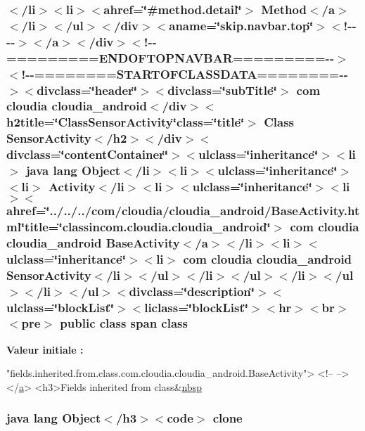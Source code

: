 \hypertarget{_sensor_activity_8html_adfb338aa5962a7e3f9a062e004b66989}{
\subsubsection[{class}]{\setlength{\rightskip}{0pt plus 5cm}$<$/li$>$$<$li$>$$<$ahref=\char`\"{}\#method.\-detail\char`\"{}$>$ Method$<$/{\bf a}$>$$<$/li$>$$<$/ul$>$$<$/div$>$$<$aname=\char`\"{}skip.\-navbar.\-top\char`\"{}$>$$<$!-\/-\/-\/-\/$>$$<$/a$>$$<$/div$>$$<$!-\/-\/=========E\-N\-D\-O\-F\-T\-O\-P\-N\-A\-V\-B\-A\-R=========-\/-\/$>$$<$!-\/-\/========S\-T\-A\-R\-T\-O\-F\-C\-L\-A\-S\-S\-D\-A\-T\-A========-\/-\/$>$$<$divclass=\char`\"{}header\char`\"{}$>$$<$divclass=\char`\"{}sub\-Title\char`\"{}$>$ com cloudia cloudia\-\_\-android$<$/div$>$$<$h2title=\char`\"{}Class\-Sensor\-Activity\char`\"{}class=\char`\"{}title\char`\"{}$>$ Class {\bf Sensor\-Activity}$<$/h2$>$$<$/div$>$$<$divclass=\char`\"{}content\-Container\char`\"{}$>$$<$ulclass=\char`\"{}inheritance\char`\"{}$>$$<$li$>$ java lang Object$<$/li$>$$<$li$>$$<$ulclass=\char`\"{}inheritance\char`\"{}$>$$<$li$>$ Activity$<$/li$>$$<$li$>$$<$ulclass=\char`\"{}inheritance\char`\"{}$>$$<$li$>$$<$ahref=\char`\"{}../../../com/cloudia/cloudia\-\_\-android/Base\-Activity.\-html\char`\"{}title=\char`\"{}classincom.\-cloudia.\-cloudia\-\_\-android\char`\"{}$>$ com cloudia cloudia\-\_\-android {\bf Base\-Activity}$<$/{\bf a}$>$$<$/li$>$$<$li$>$$<$ulclass=\char`\"{}inheritance\char`\"{}$>$$<$li$>$ com cloudia cloudia\-\_\-android {\bf Sensor\-Activity}$<$/li$>$$<$/ul$>$$<$/li$>$$<$/ul$>$$<$/li$>$$<$/ul$>$$<$/li$>$$<$/ul$>$$<$divclass=\char`\"{}description\char`\"{}$>$$<$ulclass=\char`\"{}block\-List\char`\"{}$>$$<$liclass=\char`\"{}block\-List\char`\"{}$>$$<$hr$>$$<$br$>$$<$pre$>$ public class {\bf span} class}}\label{_sensor_activity_8html_adfb338aa5962a7e3f9a062e004b66989}
{\bfseries Valeur initiale \-:}
\begin{DoxyCode}
\textcolor{stringliteral}{"fields.inherited.from.class.com.cloudia.cloudia\_android.BaseActivity"}>
<!--   -->
</\hyperlink{stylesheet_8css_a5e8981582017bb8b84c21f148345d1f7}{a}>
<h3>Fields inherited from \textcolor{keyword}{class}&\hyperlink{allclasses-frame_8html_aef915316f784c9063d942974538301a6}{nbsp}
\end{DoxyCode}
\hypertarget{_sensor_activity_8html_adc9607fcabf6f2d7f401ad52015ef6e0}{
\subsubsection[{clone}]{\setlength{\rightskip}{0pt plus 5cm}java lang Object$<$/h3$>$$<$code$>$ clone}}\label{_sensor_activity_8html_adc9607fcabf6f2d7f401ad52015ef6e0}
